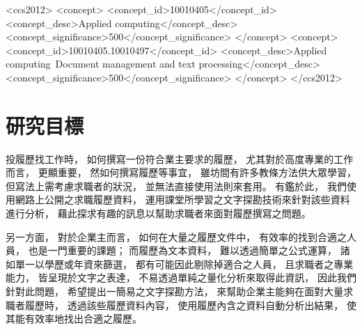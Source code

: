 \documentclass[sigconf]{acmart}
\begin{document}
\begin{CCSXML}
<ccs2012>
   <concept>
       <concept_id>10010405</concept_id>
       <concept_desc>Applied computing</concept_desc>
       <concept_significance>500</concept_significance>
       </concept>
   <concept>
       <concept_id>10010405.10010497</concept_id>
       <concept_desc>Applied computing~Document management and text processing</concept_desc>
       <concept_significance>500</concept_significance>
       </concept>
 </ccs2012>
\end{CCSXML}

\maketitle

\section{研究目標}

投履歷找工作時，
如何撰寫一份符合業主要求的履歷，
尤其對於高度專業的工作而言，
更顯重要，
然如何撰寫履歷等事宜，
雖坊間有許多教條方法供大眾學習，
但寫法上需考慮求職者的狀況，
並無法直接使用法則來套用。
有鑑於此，
我們使用網路上公開之求職履歷資料，
運用課堂所學習之文字探勘技術來針對該些資料進行分析，
藉此探求有趣的訊息以幫助求職者來面對履歷撰寫之問題。

另一方面，
對於企業主而言，
如何在大量之履歷文件中，
有效率的找到合適之人員，
也是一門重要的課題；
而履歷為文本資料，
難以透過簡單之公式運算，
諸如單一以學歷或年資來篩選，
都有可能因此剔除掉適合之人員，
且求職者之專業能力，
皆呈現於文字之表達，
不易透過單純之量化分析來取得此資訊，
因此我們針對此問題，
希望提出一簡易之文字探勘方法，
來幫助企業主能夠在面對大量求職者履歷時，
透過該些履歷資料內容，
使用履歷內含之資料自動分析出結果，
使其能有效率地找出合適之履歷。
\end{document}
